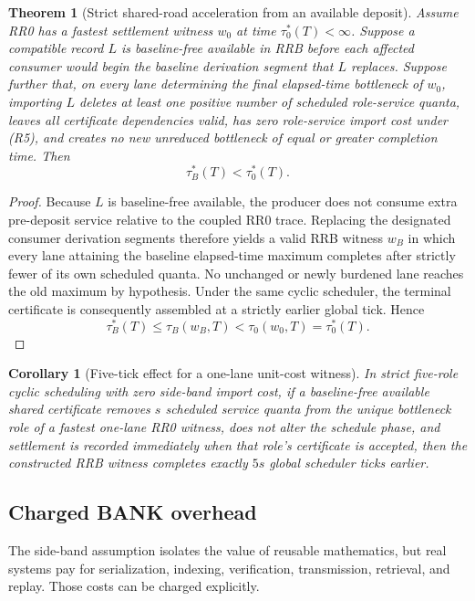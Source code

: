 \documentclass[11pt]{article}
\newtheorem{theorem}[definition]{Theorem}
\newtheorem{corollary}[definition]{Corollary}
\begin{document}
\begin{theorem}[Strict shared-road acceleration from an available deposit]
Assume RR0 has a fastest settlement witness $w_0$ at time $\tau_0^*(T)<\infty$. Suppose a compatible record $L$ is baseline-free available in RRB before each affected consumer would begin the baseline derivation segment that $L$ replaces. Suppose further that, on every lane determining the final elapsed-time bottleneck of $w_0$, importing $L$ deletes at least one positive number of scheduled role-service quanta, leaves all certificate dependencies valid, has zero role-service import cost under (R5), and creates no new unreduced bottleneck of equal or greater completion time. Then
\[
\boxed{\tau_B^*(T)<\tau_0^*(T).}
\]
\end{theorem}

\begin{proof}
Because $L$ is baseline-free available, the producer does not consume extra pre-deposit service relative to the coupled RR0 trace. Replacing the designated consumer derivation segments therefore yields a valid RRB witness $w_B$ in which every lane attaining the baseline elapsed-time maximum completes after strictly fewer of its own scheduled quanta. No unchanged or newly burdened lane reaches the old maximum by hypothesis. Under the same cyclic scheduler, the terminal certificate is consequently assembled at a strictly earlier global tick. Hence
\[
\tau_B^*(T)\le \tau_B(w_B,T)<\tau_0(w_0,T)=\tau_0^*(T).
\]
\end{proof}

\begin{corollary}[Five-tick effect for a one-lane unit-cost witness]
In strict five-role cyclic scheduling with zero side-band import cost, if a baseline-free available shared certificate removes $s$ scheduled service quanta from the unique bottleneck role of a fastest one-lane RR0 witness, does not alter the schedule phase, and settlement is recorded immediately when that role's certificate is accepted, then the constructed RRB witness completes exactly $5s$ global scheduler ticks earlier.
\end{corollary}

\subsection{Charged BANK overhead}

The side-band assumption isolates the value of reusable mathematics, but real systems pay for serialization, indexing, verification, transmission, retrieval, and replay. Those costs can be charged explicitly.
\end{document}
